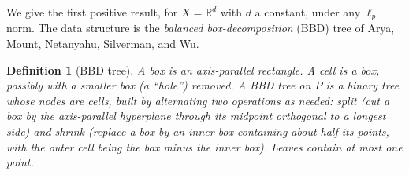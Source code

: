 \documentclass{amsart}
\newtheorem{definition}{Definition}
\newcommand{\R}{\mathbb{R}}
\begin{document}
We give the first positive result, for $X=\R^d$ with $d$ a constant, under any
$\ell_p$ norm.  The data structure is the \emph{balanced box-decomposition} (BBD) tree
of Arya, Mount, Netanyahu, Silverman, and Wu.

\begin{definition}[BBD tree]
A \emph{box} is an axis-parallel rectangle.  A \emph{cell} is a box, possibly with a
smaller box (a ``hole'') removed.  A BBD tree on $P$ is a binary tree whose nodes are
cells, built by alternating two operations as needed: \emph{split} (cut a box by the
axis-parallel hyperplane through its midpoint orthogonal to a longest side) and
\emph{shrink} (replace a box by an inner box containing about half its points, with
the outer cell being the box minus the inner box).  Leaves contain at most one point.
\end{definition}
\end{document}
